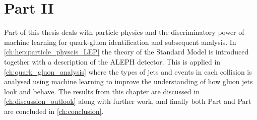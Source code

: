 \documentclass[a4paper, twoside, nobib]{tufte-book}
\newcommand{\RNum}[1]{\uppercase\expandafter{\romannumeral #1\relax}}
\begin{document}



\chapter*{Part II}
Part \RNum{2} of this thesis deals with particle physics and the discriminatory power of machine learning for quark-gluon identification and subsequent analysis. In \autoref{ch:hep:particle_physcis_LEP} the theory of the Standard Model is introduced together with a description of the ALEPH detector. This is applied in \autoref{ch:quark_gluon_analysis} where the types of jets and events in each collision is analysed using machine learning to improve the understanding of how gluon jets look and behave. The results from this chapter are discussed in \autoref{ch:discussion_outlook} along with further work, and finally both Part \RNum{1} and Part \RNum{2} are concluded in \autoref{ch:conclusion}.














\appendix

% 

\end{document}

